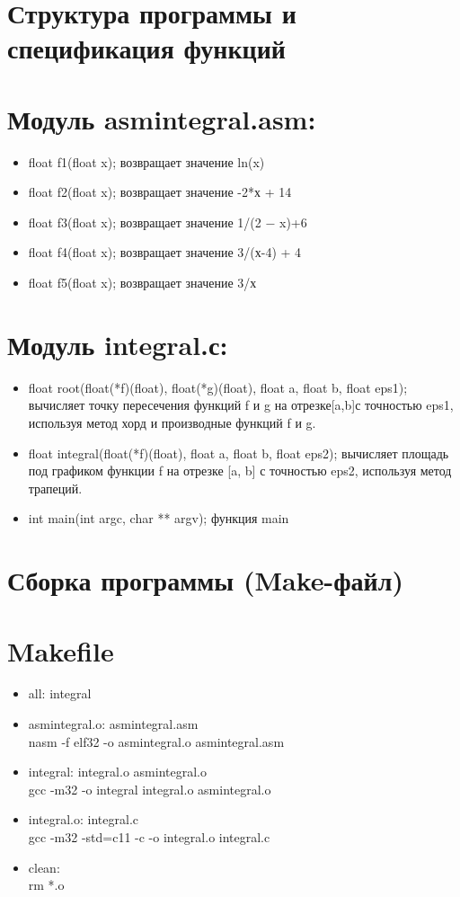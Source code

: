 \documentclass[a4paper,12pt,titlepage,finall]{article}
\begin{document}
\newpage

\section{Структура программы и спецификация функций}
\section{Модуль asmintegral.asm:}
\begin{itemize}
\item float f1(float x); возвращает значение ln(x)
\item float f2(float x); возвращает значение -2*х + 14
\item float f3(float x); возвращает значение 1/(2 − x)+6
\item float f4(float x); возвращает значение 3/(х-4) + 4
\item float f5(float x); возвращает значение 3/х
\end{itemize}
\section{Модуль integral.с:}
\begin{itemize}
\item float root(float(*f)(float), float(*g)(float), float a, float b, float eps1); вычисляет точку пересечения функций f и g на отрезке[a,b]с точностью eps1, используя метод хорд и производные функций f и g.
\item float integral(float(*f)(float), float a, float b, float eps2); вычисляет площадь под графиком функции f на отрезке [a, b] с точностью eps2,
используя метод трапеций.
\item int main(int argc, char ** argv); функция main
\end{itemize}

\newpage

\section{Сборка программы (Make-файл)}
\section{Makefile}
\begin{itemize}
\item all: integral
\item asmintegral.o: asmintegral.asm
 \\nasm -f elf32 -o asmintegral.o asmintegral.asm
\item integral: integral.o asmintegral.o
    \\ gcc -m32 -o integral integral.o asmintegral.o
\item integral.o: integral.c 
	\\gcc -m32 -std=c11 -c -o integral.o integral.c
\item clean:
	\\rm *.o
\end{itemize}	
\end{document}

